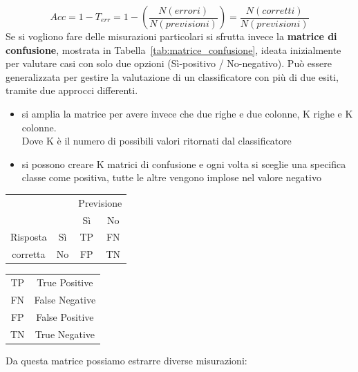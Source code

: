 %
\begin{equation}
	Acc = 1 - T_{err} = 1 - \left( \frac{N(errori)}{N(previsioni)} \right) = \frac{N(corretti)}{N(previsioni)}
	\label{eq:accuratezza}
\end{equation}
%
Se si vogliono fare delle misurazioni particolari si sfrutta invece la \textbf{matrice di confusione}, mostrata in Tabella~\ref{tab:matrice_confusione}, ideata inizialmente per valutare casi con solo due opzioni (Sì-positivo / No-negativo). Può essere generalizzata per gestire la valutazione di un classificatore con più di due esiti, tramite due approcci differenti.
\begin{itemize}
	\item si amplia la matrice per avere invece che due righe e due colonne, K righe e K colonne.\\
	Dove K è il numero di possibili valori ritornati dal classificatore
	\item si possono creare K matrici di confusione e ogni volta si sceglie una specifica classe come positiva, tutte le altre vengono implose nel valore negativo
\end{itemize}
%
\begin{multicols}{2}
\begin{center}
	\begin{tabular}{cc|c|c|}
		 &  & \multicolumn{2}{|c|}{Previsione}\\
		 &  & Sì & No\\
		 \hline
		 Risposta & Sì & TP & FN\\
		 \hline
		 corretta & No & FP & TN\\
		\hline
	\end{tabular}
	\label{tab:matrice_confusione}
	\begin{tabular}{|c|c|}
		\hline
		TP & True Positive \\
		FN & False Negative \\
		FP & False Positive \\
		TN & True Negative \\
		\hline
	\end{tabular}
	\label{tab:MC_significato}
\end{center}
\end{multicols}
%
Da questa matrice possiamo estrarre diverse misurazioni:
